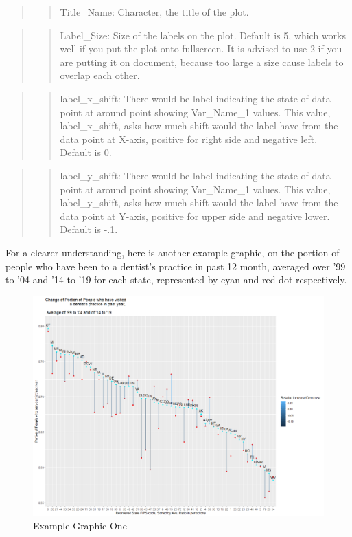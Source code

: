 \documentclass[
]{article}
\begin{document}
\begin{quote}
\begin{quote}
Title\_Name: Character, the title of the plot.
\end{quote}
\end{quote}

\begin{quote}
\begin{quote}
Label\_Size: Size of the labels on the plot. Default is 5, which works
well if you put the plot onto fullscreen. It is advised to use 2 if you
are putting it on document, because too large a size cause labels to
overlap each other.
\end{quote}
\end{quote}

\begin{quote}
\begin{quote}
label\_x\_shift: There would be label indicating the state of data point
at around point showing Var\_Name\_1 values. This value,
label\_x\_shift, asks how much shift would the label have from the data
point at X-axis, positive for right side and negative left. Default is
0.
\end{quote}
\end{quote}

\begin{quote}
\begin{quote}
label\_y\_shift: There would be label indicating the state of data point
at around point showing Var\_Name\_1 values. This value,
label\_y\_shift, asks how much shift would the label have from the data
point at Y-axis, positive for upper side and negative lower. Default is
-.1.
\end{quote}
\end{quote}

For a clearer understanding, here is another example graphic, on the
portion of people who have been to a dentist's practice in past 12
month, averaged over '99 to '04 and '14 to '19 for each state,
represented by cyan and red dot respectively.

\begin{figure}
\centering
\includegraphics{Change_By_State_02.png}
\caption{Example Graphic One}
\end{figure}
\end{document}
